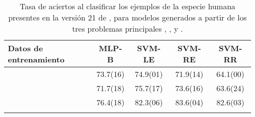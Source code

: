 %
\begin{table}[h]
  \tableStyle
  \begin{tabular}{lSSSS}
    \toprule
    {Datos de entrenamiento} & {MLP-B}  & {SVM-LE} & {SVM-RE} & {SVM-RR} \\
    \midrule
    \tripletsvm{}               & 73.7(16) & 74.9(01) & 71.9(14) & 64.1(00) \\
    \mipred{}                   & 71.7(18) & 75.7(17) & 73.6(16) & 63.6(24) \\
    \micropred{}                & 76.4(18) & 82.3(06) & 83.6(04) & 82.6(03) \\
    \bottomrule
    \\
  \end{tabular}
  \caption{\captionStyle Tasa de aciertos al clasificar los
    ejemplos de la especie humana presentes en la versión 21 de
    \work\mirbase{}, para modelos generados a partir de los tres
    problemas principales \sbs\tripletsvm{}, \sbs\mipred{}, y
    \sbs\micropred{}.
    }
  \label{tbl:suppl-mirbase21}
\end{table}
%
